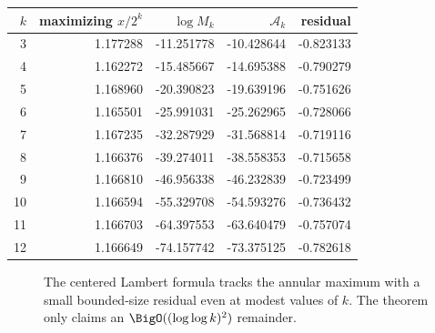 \documentclass[11pt,oneside]{article}
\theoremstyle{definition}
\theoremstyle{remark}
\begin{document}
\begin{center}
\begin{tabular}{@{}rrrrr@{}}
\toprule
\(k\) & maximizing \(x/2^k\) & \(\log M_k\) & \(\mathcal A_k\) & residual \\
\midrule
3  & 1.177288 & -11.251778 & -10.428644 & -0.823133 \\
4  & 1.162272 & -15.485667 & -14.695388 & -0.790279 \\
5  & 1.168960 & -20.390823 & -19.639196 & -0.751626 \\
6  & 1.165501 & -25.991031 & -25.262965 & -0.728066 \\
7  & 1.167235 & -32.287929 & -31.568814 & -0.719116 \\
8  & 1.166376 & -39.274011 & -38.558353 & -0.715658 \\
9  & 1.166810 & -46.956338 & -46.232839 & -0.723499 \\
10 & 1.166594 & -55.329708 & -54.593276 & -0.736432 \\
11 & 1.166703 & -64.397553 & -63.640479 & -0.757074 \\
12 & 1.166649 & -74.157742 & -73.375125 & -0.782618 \\
\bottomrule
\end{tabular}
\end{center}

\begin{figure}[ht]
\centering
{}
\caption{The centered Lambert formula tracks the annular maximum with a
small bounded-size residual even at modest values of \(k\).  The theorem only
claims an \(\BigO((\log\log k)^2)\) remainder.}
\label{fig:numerical-comparison}
\end{figure}
\end{document}
